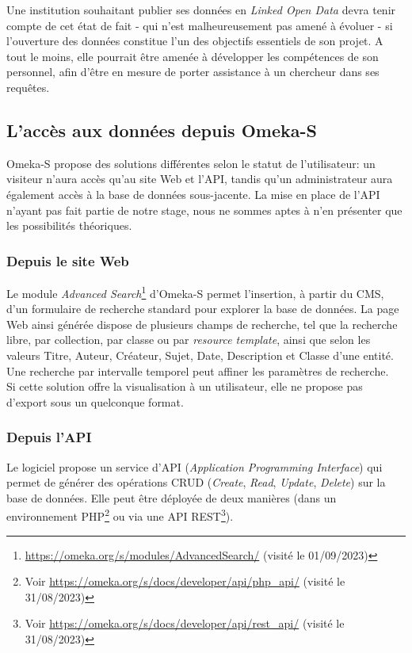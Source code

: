 \documentclass[a4paper,12pt,twoside]{book}
\begin{document}
Une institution souhaitant publier ses données en \textit{Linked Open Data} devra tenir compte de cet état de fait - qui n'est malheureusement pas amené à évoluer - si l'ouverture des données constitue l'un des objectifs essentiels de son projet. A tout le moins, elle pourrait être amenée à développer les compétences de son personnel, afin d'être en mesure de porter assistance à un chercheur dans ses requêtes. 

\subsection{L'accès aux données depuis Omeka-S}

Omeka-S propose des solutions différentes selon le statut de l'utilisateur: un visiteur n'aura accès qu'au site Web et l'API, tandis qu'un administrateur aura également accès à la base de données sous-jacente. La mise en place de l'API n'ayant pas fait partie de notre stage, nous ne sommes aptes à n'en présenter que les possibilités théoriques.

\subsubsection{Depuis le site Web}
Le module \textit{Advanced Search}\footnote{\url{https://omeka.org/s/modules/AdvancedSearch/} (visité le 01/09/2023)} d'Omeka-S permet l'insertion, à partir du CMS, d'un formulaire de recherche standard pour explorer la base de données. La page Web ainsi générée dispose de plusieurs champs de recherche, tel que la recherche libre, par collection, par classe ou par \textit{resource template}, ainsi que selon les valeurs Titre, Auteur, Créateur, Sujet, Date, Description et Classe d'une entité. Une recherche par intervalle temporel peut affiner les paramètres de recherche.\\

Si cette solution offre la visualisation à un utilisateur, elle ne propose pas d'export sous un quelconque format.


\subsubsection{Depuis l'API}
Le logiciel propose un service d'API (\textit{Application Programming Interface}) qui permet de générer des opérations CRUD (\textit{Create}, \textit{Read}, \textit{Update}, \textit{Delete}) sur la base de données. Elle peut être déployée de deux manières (dans un environnement PHP\footnote{Voir \url{https://omeka.org/s/docs/developer/api/php\_api/} (visité le 31/08/2023)} ou via une API REST\footnote{Voir \url{https://omeka.org/s/docs/developer/api/rest\_api/} (visité le 31/08/2023)}).\\
\end{document}
